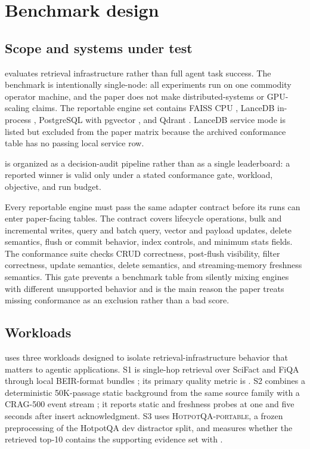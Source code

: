 \section{Benchmark design}

\subsection{Scope and systems under test}

\sys evaluates retrieval infrastructure rather than full agent task success. The benchmark is intentionally single-node: all experiments run on one commodity operator machine, and the paper does not make distributed-systems or GPU-scaling claims. The reportable engine set contains FAISS CPU \citep{johnson2019faiss}, LanceDB in-process \citep{lancedb}, PostgreSQL with pgvector \citep{pgvector}, and Qdrant \citep{qdrant}. LanceDB service mode is listed but excluded from the paper matrix because the archived conformance table has no passing local service row.

\sys is organized as a decision-audit pipeline rather than as a single leaderboard: a reported winner is valid only under a stated conformance gate, workload, objective, and run budget.

Every reportable engine must pass the same adapter contract before its runs can enter paper-facing tables. The contract covers lifecycle operations, bulk and incremental writes, query and batch query, vector and payload updates, delete semantics, flush or commit behavior, index controls, and minimum stats fields. The conformance suite checks CRUD correctness, post-flush visibility, filter correctness, update semantics, delete semantics, and streaming-memory freshness semantics. This gate prevents a benchmark table from silently mixing engines with different unsupported behavior and is the main reason the paper treats missing conformance as an exclusion rather than a bad score.

\subsection{Workloads}

\sys uses three workloads designed to isolate retrieval-infrastructure behavior that matters to agentic applications. S1 is single-hop retrieval over SciFact and FiQA through local BEIR-format bundles \citep{thakur2021beir,wadden2020scifact,maia2018fiqa}; its primary quality metric is \ndcg. S2 combines a deterministic 50K-passage static background from the same source family with a CRAG-500 event stream \citep{facebookcrag}; it reports static \ndcg{} and freshness probes at one and five seconds after insert acknowledgment. S3 uses \textsc{HotpotQA-portable}, a frozen preprocessing of the HotpotQA dev distractor split, and measures whether the retrieved top-10 contains the supporting evidence set with \ecov.

